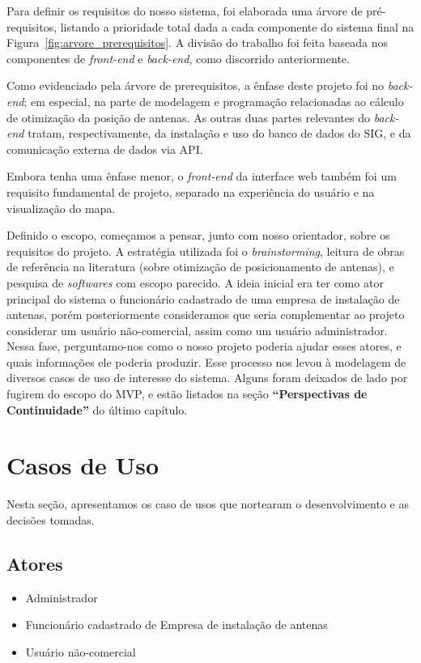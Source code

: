 \documentclass[]{politex}
\begin{document}
Para definir os requisitos do nosso sistema, foi elaborada uma árvore de
pré-requisitos, listando a prioridade total dada a cada componente do sistema
final na Figura~\ref{fig:arvore_prerequisitos}. A divisão do trabalho foi feita
baseada nos componentes de \textit{front-end} e \textit{back-end}, como
discorrido anteriormente.

Como evidenciado pela árvore de prerequisitos, a ênfase deste
projeto foi no \textit{back-end}; em especial, na parte de modelagem e
programação relacionadas ao cálculo de otimização da posição de antenas. As
outras duas partes relevantes do \textit{back-end} tratam, respectivamente, da
instalação e uso do banco de dados do SIG, e da comunicação externa de dados via
API.

Embora tenha uma ênfase menor, o \textit{front-end} da interface web também foi
um requisito fundamental de projeto, separado na experiência do usuário e na
visualização do mapa.

Definido o escopo, começamos a pensar, junto com nosso orientador, sobre os
requisitos do projeto. A estratégia utilizada foi o \textit{brainstorming},
leitura de obras de referência na literatura (sobre otimização de posicionamento
de antenas), e pesquisa de \textit{softwares} com escopo parecido. A ideia
inicial era ter como ator principal do sistema o funcionário cadastrado de uma
empresa de instalação de antenas, porém posteriormente consideramos que seria
complementar ao projeto considerar um usuário não-comercial, assim como um
usuário administrador. Nessa fase, perguntamo-nos como o nosso projeto poderia
ajudar esses atores, e quais informações ele poderia produzir. Esse processo nos
levou à modelagem de diversos casos de uso de interesse do sistema. Alguns foram
deixados de lado por fugirem do escopo do MVP, e estão listados na seção
\textbf{``Perspectivas de Continuidade''} do último capítulo.

\section{Casos de Uso}

Nesta seção, apresentamos os caso de usos que nortearam o desenvolvimento e as
decisões tomadas.

\newcommand{\usecase}[1]{\refstepcounter{usecasecounter}\label{usecase:#1}
\arabic{usecasecounter}}

\subsection{Atores}
\begin{itemize}
\item Administrador
\item Funcionário cadastrado de Empresa de instalação de antenas
\item Usuário não-comercial
\end{itemize}
\end{document}
